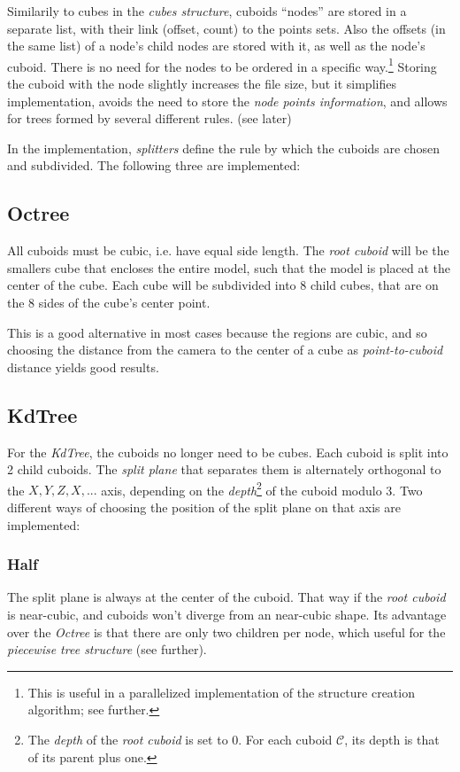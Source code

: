 \documentclass[a4paper,10pt,abstracton,notitlepage]{scrreprt}
\begin{document}
Similarily to cubes in the \emph{cubes structure}, cuboids ``nodes'' are stored in a separate list, with their link (offset, count) to the points sets. Also the offsets (in the same list) of a node's child nodes are stored with it, as well as the node's cuboid. There is no need for the nodes to be ordered in a specific way.\footnote{This is useful in a parallelized implementation of the structure creation algorithm; see further.} Storing the cuboid with the node slightly increases the file size, but it simplifies implementation, avoids the need to store the \emph{node points information}, and allows for trees formed by several different rules. (see later)

In the implementation, \emph{splitters} define the rule by which the cuboids are chosen and subdivided. The following three are implemented:

\subsection{Octree}
All cuboids must be cubic, i.e. have equal side length. The \emph{root cuboid} will be the smallers cube that encloses the entire model, such that the model is placed at the center of the cube. Each cube will be subdivided into 8 child cubes, that are on the 8 sides of the cube's center point.

This is a good alternative in most cases because the regions are cubic, and so choosing the distance from the camera to the center of a cube as \emph{point-to-cuboid} distance yields good results.

\subsection{KdTree}
For the \emph{KdTree}, the cuboids no longer need to be cubes. Each cuboid is split into 2 child cuboids. The \emph{split plane} that separates them is alternately orthogonal to the $X, Y, Z, X, ...$ axis, depending on the \emph{depth}\footnote{The \emph{depth} of the \emph{root cuboid} is set to 0. For each cuboid $\mathcal{C}$, its depth is that of its parent plus one.} of the cuboid modulo 3. Two different ways of choosing the position of the split plane on that axis are implemented:

\subsubsection{Half}
The split plane is always at the center of the cuboid. That way if the \emph{root cuboid} is near-cubic, and  cuboids won't diverge from an near-cubic shape. Its advantage over the \emph{Octree} is that there are only two children per node, which useful for the \emph{piecewise tree structure} (see further).
\end{document}
